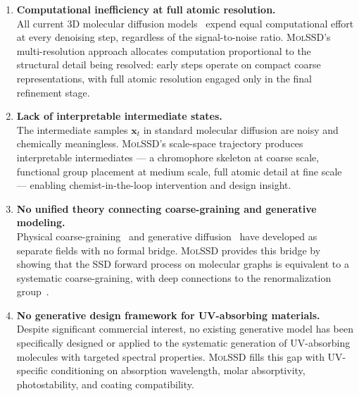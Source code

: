 \documentclass[11pt,a4paper]{article}
\newcommand{\molssd}{\textsc{MolSSD}}
\newcommand{\xt}{\mathbf{x}_t}
\begin{document}
\begin{enumerate}[leftmargin=*,label=\textbf{Gap~\arabic*.}]
  \item \textbf{Computational inefficiency at full atomic resolution.} \\
    All current 3D molecular diffusion models~\citep{hoogeboom2022edm,morehead2024gcdm}
    expend equal computational effort at every denoising step, regardless of the
    signal-to-noise ratio. \molssd{}'s multi-resolution approach allocates computation
    proportional to the structural detail being resolved: early steps operate on compact
    coarse representations, with full atomic resolution engaged only in the final
    refinement stage.

  \item \textbf{Lack of interpretable intermediate states.} \\
    The intermediate samples $\xt$ in standard molecular diffusion are noisy and
    chemically meaningless. \molssd{}'s scale-space trajectory produces interpretable
    intermediates --- a chromophore skeleton at coarse scale, functional group placement at
    medium scale, full atomic detail at fine scale --- enabling chemist-in-the-loop
    intervention and design insight.

  \item \textbf{No unified theory connecting coarse-graining and generative modeling.} \\
    Physical coarse-graining~\citep{noid2008cg} and generative
    diffusion~\citep{ho2020ddpm,song2021scorebased} have developed as separate fields
    with no formal bridge. \molssd{} provides this bridge by showing that the SSD forward
    process on molecular graphs is equivalent to a systematic coarse-graining, with deep
    connections to the renormalization group~\citep{wilson1983renormalization,kadanoff1966scaling}.

  \item \textbf{No generative design framework for UV-absorbing materials.} \\
    Despite significant commercial interest, no existing generative model has been
    specifically designed or applied to the systematic generation of UV-absorbing
    molecules with targeted spectral properties. \molssd{} fills this gap with
    UV-specific conditioning on absorption wavelength, molar absorptivity,
    photostability, and coating compatibility.

\end{enumerate}


\end{document}
